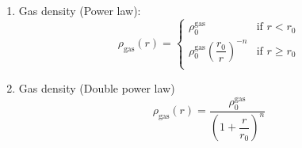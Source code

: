 \documentclass{beamer}
\begin{document}
\begin{frame}
	\begin{enumerate}
		\item Gas density (Power law):
		\begin{equation}
			\rho_\text{gas}(r) = \left \{
			\begin{matrix}
			\rho_0^\text{gas} & \text{if $r < r_0$}\\
			\rho_0^\text{gas}\left(\dfrac{r_0}{r}\right)^{-n} & \text{if $r \geq r_0$}\\
			\end{matrix}
			\right.
		\end{equation}
		\item Gas density (Double power law)
		\begin{equation}\label{eq: rdensity}
		\rho_\text{gas}(r) = \dfrac{\rho_0^\text{gas}}{\left(1 + \dfrac{r}{r_0}\right)^n}
		\end{equation}
	\end{enumerate}
\end{frame}
\end{document}
